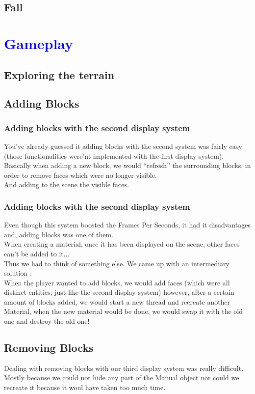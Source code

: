 \documentclass[article]{report}         %
\begin{document}
      \section{Fall}
    \chapter{\textcolor{blue}{Gameplay}}
      \section{Exploring the terrain}
      \section{Adding Blocks}
        \subsection{Adding blocks with the second display system}
          You've already guessed it adding blocks with the second system was fairly easy (those functionalities were'nt implemented with the first display system).\\
          Basically when adding a new block, we would ``refresh'' the surrounding blocks, in order to remove faces which were no longer visible.\\
          And adding to the scene the visible faces.

        \subsection{Adding blocks with the second display system}
          Even though this system boosted the Frames Per Seconds, it had it disadvantages and, adding blocks was one of them.\\
          When creating a material, once it has been displayed on the scene, other faces can't be added to it...\\ 
          Thus we had to think of something else. We came up with an intermediary solution : \\
          When the player wanted to add blocks, we would add faces (which were all distinct entities, just like the second display system) however, after a certain amount of blocks added, we would start a new thread and recreate another Material, when the new material would be done, we would swap it with the old one and destroy the old one!

      \section{Removing Blocks}
        Dealing with removing blocks with our third display system was really difficult. Mostly because we could not hide any part of the Manual object nor could we recreate it because it woul have taken too much time.\\
\end{document}

